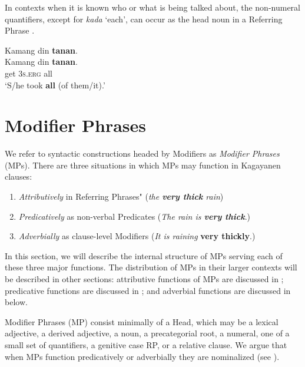In contexts when it is known who or what is being talked about, the non-numeral quantifiers, except for \textit{kada} ‘each’, can occur as the head noun in a Referring Phrase .

\ea
\label{bkm:Ref329087044}
Kamang  din  \textbf{tanan}. \\\smallskip
 \gll Kamang  din  \textbf{tanan}. \\
get  3\textsc{s.erg}  all \\
\glt  ‘S/he took \textbf{all} (of them/it).’
\z

\section{Modifier Phrases}
\label{bkm:Ref418142991} \label{sec:modifierphrases} 

We refer to syntactic constructions headed by Modifiers as \textit{Modifier Phrases} (MPs). There are three situations in which MPs may function in Kagayanen clauses:

\newpage
\begin{enumerate}
\item \textit{Attributively} in Referring Phrases" (\textit{the \textbf{very thick} rain})
\item \textit{Predicatively} as non-verbal Predicates (\textit{The rain is \textbf{very thick}}.)
\item \textit{Adverbially} as clause-level Modifiers (\textit{It is raining} \textbf{very thickly}.)
\end{enumerate}

In this section, we will describe the internal structure of MPs serving each of these three major functions. The distribution of MPs in their larger contexts will be described in other sections: attributive functions of MPs are discussed in ; predicative functions are discussed in ; and adverbial functions are discussed in  below.

Modifier Phrases (MP) consist minimally of a Head, which may be a lexical adjective, a derived adjective, a noun, a precategorial root, a numeral, one of a small set of quantifiers, a genitive case RP, or a relative clause. We argue that when MPs function predicatively or adverbially they are nominalized (see ).

